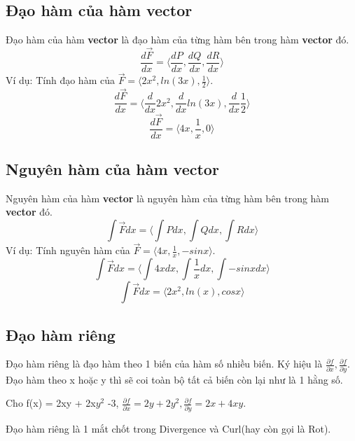 \documentclass{article}
\begin{document}
\subsection{Đạo hàm của hàm vector}
Đạo hàm của hàm \textbf{vector} là đạo hàm của từng hàm bên trong hàm \textbf{vector} đó.
\[\frac{d \vec{F}}{dx}=\langle \frac{dP}{dx}, \frac{dQ}{dx}, \frac{dR}{dx} \rangle\]
Ví dụ: Tính đạo hàm của $\vec{F} = \langle 2x^2, ln(3x), \frac{1}{2} \rangle$.
\[\frac{d \vec{F}}{dx}=\langle \frac{d}{dx}2x^2, \frac{d}{dx}ln(3x), \frac{d}{dx}\frac{1}{2} \rangle\]
\[\frac{d \vec{F}}{dx}=\langle 4x, \frac{1}{x}, 0 \rangle\]

\subsection{Nguyên hàm của hàm vector}
Nguyên hàm của hàm \textbf{vector} là nguyên hàm của từng hàm bên trong hàm \textbf{vector} đó.
\[\int \vec{F}dx = \langle \int Pdx, \int Qdx,\int Rdx\rangle\]
Ví dụ: Tính nguyên hàm của $\vec{F} = \langle 4x, \frac{1}{x}, -sinx \rangle$.
\[\int \vec{F}dx = \langle \int 4xdx, \int \frac{1}{x}dx,\int -sinxdx\rangle\]
\[\int \vec{F}dx = \langle 2x^2, ln(x), cosx \rangle\]

\subsection{Đạo hàm riêng}
Đạo hàm riêng là đạo hàm theo 1 biến của hàm số nhiều biến. Ký hiệu là $\frac{\partial f}{\partial x}, \frac{\partial f}{\partial y}$. Đạo hàm theo x hoặc y thì sẽ coi toàn bộ tất cả biến còn lại như là 1 hằng số.
\begin{center}
    Cho f(x) = 2xy + 2x$y^2$ -3, $\frac{\partial f}{\partial x} = 2y + 2y^2, \frac{\partial f}{\partial y}=2x+4xy$.
\end{center}
Đạo hàm riêng là 1 mắt chốt trong Divergence và Curl(hay còn gọi là Rot).
\end{document}
